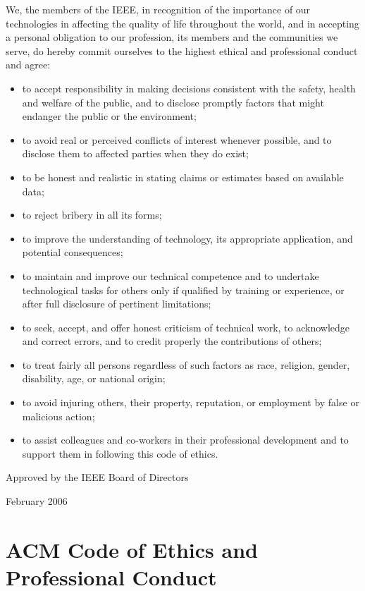 \vspace{.1in}
We, the members of the IEEE, in recognition of the importance of our technologies in affecting the quality of life throughout the world, and in accepting a personal obligation to our profession, its members and the communities we serve, do hereby commit ourselves to the highest ethical and professional conduct and agree:
\begin{itemize}
\item to accept responsibility in making decisions consistent with the safety, health and welfare of the public, and to disclose promptly factors that might endanger the public or the environment;
\item to avoid real or perceived conflicts of interest whenever possible, and to disclose them to affected parties when they do exist;
\item to be honest and realistic in stating claims or estimates based on available data;
\item to reject bribery in all its forms;
\item to improve the understanding of technology, its appropriate application, and potential consequences;
\item to maintain and improve our technical competence and to undertake technological tasks for others only if qualified by training or experience, or after full disclosure of pertinent limitations;
\item to seek, accept, and offer honest criticism of technical work, to acknowledge and correct errors, and to credit properly the contributions of others;
\item to treat fairly all persons regardless of such factors as race, religion, gender, disability, age, or national origin;
\item to avoid injuring others, their property, reputation, or employment by false or malicious action;
\item to assist colleagues and co-workers in their professional development and to support them in following this code of ethics.
\end{itemize}

Approved by the IEEE Board of Directors

February 2006




\section{ACM Code of Ethics and Professional Conduct
}



